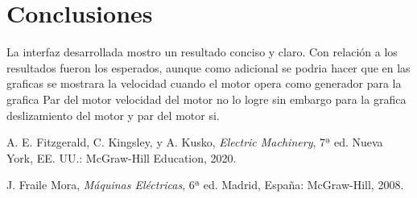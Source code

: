 \documentclass[conference]{IEEEtran}
\theoremstyle{mytheoremstyle}
\theoremstyle{mytheoremstyle}
\theoremstyle{myproblemstyle}
\begin{document}

            




        
            \section{Conclusiones}
            La interfaz desarrollada mostro un resultado conciso y claro. Con relación a los resultados fueron los esperados, aunque como adicional se podria hacer que en las graficas se mostrara la velocidad cuando el motor opera como generador para la grafica Par del motor velocidad del motor no lo logre sin embargo para la grafica deslizamiento del motor y par del motor si.


            \begin{thebibliography}{1}
                
                A. E. Fitzgerald, C. Kingsley, y A. Kusko, \emph{Electric Machinery}, 7ª ed. Nueva York, EE. UU.: McGraw-Hill Education, 2020.
                \label{Fitzgerald2020}


                J. Fraile Mora, \emph{Máquinas Eléctricas}, 6ª ed. Madrid, España: McGraw-Hill, 2008.
                \label{Fraile2008}

            \end{thebibliography}

        
\end{document}
